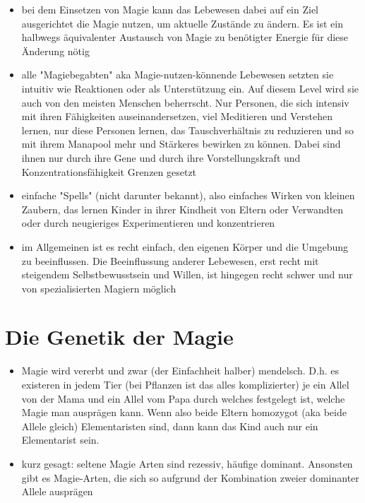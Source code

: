 \begin{itemize}
	\item bei dem Einsetzen von Magie kann das Lebewesen dabei auf ein Ziel ausgerichtet die Magie nutzen, um aktuelle Zustände zu ändern. Es ist ein halbwegs äquivalenter Austausch von Magie zu benötigter Energie für diese Änderung nötig
	\item alle "Magiebegabten" aka Magie-nutzen-könnende Lebewesen setzten sie intuitiv wie Reaktionen oder als Unterstützung ein. Auf diesem Level wird sie auch von den meisten Menschen beherrscht. Nur Personen, die sich intensiv mit ihren Fähigkeiten auseinandersetzen, viel Meditieren und Verstehen lernen, nur diese Personen lernen, das Tauschverhältnis zu reduzieren und so mit ihrem Manapool mehr und Stärkeres bewirken zu können. Dabei sind ihnen nur durch ihre Gene und durch ihre Vorstellungskraft und Konzentrationsfähigkeit Grenzen gesetzt
	\item einfache "Spells" (nicht darunter bekannt), also einfaches Wirken  von kleinen Zaubern, das lernen Kinder in ihrer Kindheit von Eltern oder Verwandten oder durch neugieriges Experimentieren und konzentrieren
	\item im Allgemeinen ist es recht einfach, den eigenen Körper und die Umgebung zu beeinflussen. Die Beeinflussung anderer Lebewesen, erst recht mit steigendem Selbstbewusstsein und Willen, ist hingegen recht schwer und nur von spezialisierten Magiern möglich
\end{itemize}


\section{Die Genetik der Magie}
\begin{itemize}
	\item Magie wird vererbt und zwar (der Einfachheit halber) mendelsch. D.h. es existeren in jedem Tier (bei Pflanzen ist das alles komplizierter) je ein Allel von der Mama und ein Allel vom Papa durch welches festgelegt ist, welche Magie man ausprägen kann. Wenn also beide Eltern homozygot (aka beide Allele gleich) Elementaristen sind, dann kann das Kind auch nur ein Elementarist sein.
	\item kurz gesagt: seltene Magie Arten sind rezessiv, häufige dominant. Ansonsten gibt es Magie-Arten, die sich so aufgrund der Kombination zweier dominanter Allele ausprägen
\end{itemize}
